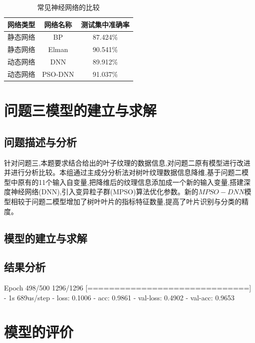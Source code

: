 \documentclass{whutmod}
\begin{document}
		\begin{table}[H]
	 \centering	\caption{常见神经网络的比较}\label{heng}
		\begin{tabular}{ccc}
			\toprule[2pt]
			\multicolumn{1}{m{3cm}}{\centering 网络类型}
			 & \multicolumn{1}{m{3cm}}{\centering 网络名称}
			  &\multicolumn{1}{m{4cm}}{\centering 测试集中准确率}
			  \\
			\midrule[1pt]
			静态网络	 &  BP &87.424\%  \\ 
			静态网络	 &  Elman &90.541\%  \\ 
			动态网络	 &  DNN &89.912\%  \\ 
			动态网络	 &  PSO-DNN &91.037\%  \\ 
			\bottomrule[2pt]	
		\end{tabular}

	\end{table}



	\section{问题三模型的建立与求解}
    \subsection{问题描述与分析}
    针对问题三,本题要求结合给出的叶子纹理的数据信息,对问题二原有模型进行改进并进行分析比较。本组通过主成分分析法对树叶纹理数据信息降维,基于问题二模型中原有的11个输入自变量,把降维后的纹理信息添加成一个新的输入变量,搭建深度神经网络(DNN),引入变异粒子群(MPSO)算法优化参数。新的$MPSO-DNN$模型相较于问题二模型增加了树叶叶片的指标特征数量,提高了叶片识别与分类的精度。
    	
	
		
    \subsection{模型的建立与求解}
    
    \subsection{结果分析}
	
	Epoch 498/500
	1296/1296 [==============================] - 1s 689us/step - loss: 0.1006 - acc: 0.9861 - val-loss: 0.4902 - val-acc: 0.9653
	\section{模型的评价}
\end{document}
